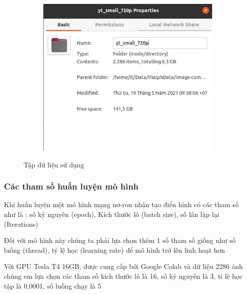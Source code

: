 \begin{figure}
    \begin{subfigure}{0.6\textwidth}
        \includegraphics[width=1.\linewidth]{Chapters/items/data.jpg}

        \label{fig: data}
    \end{subfigure}
    \caption{Tập dữ liệu sử dụng}
\end{figure}

\subsubsection{Các tham số huấn luyện mô hình}
Khi huấn luyện một mô hình mạng nơ-ron nhận tạo điển hình có
các tham số như là : số kỷ nguyên (epoch), Kích thước lô (batch size),
số lân lặp lại (Iterations)

Đối với mô hình này chúng ta phải lựa chọn thêm 1 số tham số giống như
số luồng (thread), tỷ lệ học (learning rate) để mô hình trở lên linh hoạt hơn

\newpage
Với GPU Tesla T4 16GB, được cung cấp bởi Google Colab và dữ liệu
2286 ảnh chúng em lựa chọn các tham số kích thước lô là 16, số kỷ nguyên là 3,
tỉ lệ học tập là 0,0001, số luồng chạy là 5

